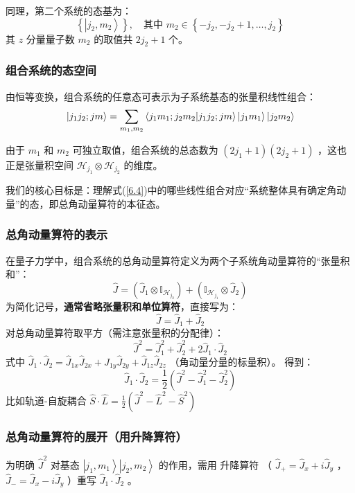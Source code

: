 同理，第二个系统的态基为：
\begin{equation}
	\left\{ \left| j_2, m_2 \right> \right\}, \quad \text{其中 } m_2 \in \left\{ -j_2, -j_2+1, \dots, j_2 \right\} 
\end{equation}
其 \(z\) 分量量子数 \(m_2\) 的取值共 \(2j_2+1\) 个。


\subsubsection{ 组合系统的态空间}
由恒等变换，组合系统的任意态可表示为子系统基态的张量积线性组合：
\begin{equation}\label{6.4}
	\ket{j_1 j_2; j m} = \sum_{m_1, m_2} \bra{j_1 m_1; j_2 m_2}\ket{j_1 j_2; j m} \ket{j_1 m_1}\ket{	j_2 m_2}
\end{equation}

由于 \(m_1\) 和 \(m_2\) 可独立取值，组合系统的总态数为 \((2j_1+1)(2j_2+1)\) ，这也正是张量积空间 \(\mathcal{H}_{j_1} \otimes \mathcal{H}_{j_2}\) 的维度。

我们的核心目标是：理解式(\ref{6.4})中的哪些线性组合对应“系统整体具有确定角动量”的态，即总角动量算符的本征态。

\subsubsection{总角动量算符的表示}
在量子力学中，组合系统的总角动量算符定义为两个子系统角动量算符的“张量积和”：
\begin{equation}
	\hat{J} = \left( \hat{J}_1 \otimes \mathbb{I}_{\mathcal{H}_{j_2}} \right) + \left( \mathbb{I}_{\mathcal{H}_{j_1}} \otimes \hat{J}_2 \right) 
\end{equation}
为简化记号，\textbf{通常省略张量积和单位算符}，直接写为：
\begin{equation}
	\hat{J} = \hat{J}_1 + \hat{J}_2 
\end{equation}
对总角动量算符取平方（需注意张量积的分配律）：
\begin{equation}
	\hat{J}^2 = \hat{J}_1^2 + \hat{J}_2^2 + 2\hat{J}_1 \cdot \hat{J}_2 \label{6.7b}
\end{equation}
式中 \(\hat{J}_1 \cdot \hat{J}_2 = \hat{J}_{1x}\hat{J}_{2x} + \hat{J}_{1y}\hat{J}_{2y} + \hat{J}_{1z}\hat{J}_{2z}\) （角动量分量的标量积）。
得到：
\[\boxed{
	{\hat J_1} \cdot {\hat J_2} = \frac{1}{2}\left( {{{\hat J}^2} - \hat J_1^2 - \hat J_2^2} \right)
}\]
比如轨道-自旋耦合  \(\displaystyle \hat{S} \cdot \hat{L} = \frac{1}{2} (\hat{J}^2 - \hat{L}^2 - \hat{S}^2)\) 
\subsubsection{总角动量算符的展开（用升降算符）}
为明确  \(\hat{J}^2\)  对基态 \(\left| j_1, m_1 \right>\left| j_2, m_2 \right>\) 的作用，需用 \(\textbf{升降算符}\) （ \(\hat{J}_+ = \hat{J}_x + i\hat{J}_y\) ， \(\hat{J}_- = \hat{J}_x - i\hat{J}_y\) ）重写 \(\hat{J}_1 \cdot \hat{J}_2\) 。

